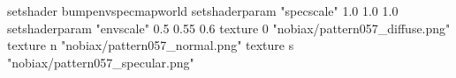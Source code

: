 setshader bumpenvspecmapworld
setshaderparam "specscale" 1.0 1.0 1.0
setshaderparam "envscale"  0.5 0.55 0.6
   texture 0 "nobiax/pattern057_diffuse.png"
   texture n "nobiax/pattern057_normal.png"
   texture s "nobiax/pattern057_specular.png"